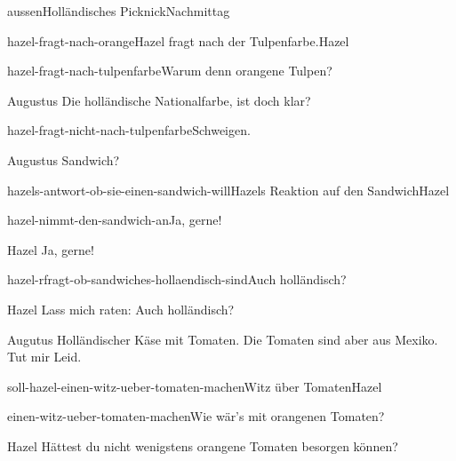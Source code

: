 \documentclass[12pt]{article}
\begin{document}
\begin{scene}{aussen}{Holländisches Picknick}{Nachmittag}
\begin{decision}{hazel-fragt-nach-orange}{\gls{Hazel} fragt nach der Tulpenfarbe.}{Hazel}
\begin{option}{hazel-fragt-nach-tulpenfarbe}{Warum denn orangene Tulpen?}
                \begin{dialog}{Augustus}
                    Die holländische Nationalfarbe, ist doch klar?
                \end{dialog}
            \end{option}

            \begin{option}{hazel-fragt-nicht-nach-tulpenfarbe}{Schweigen.}
            \end{option}
        \end{decision}


        \begin{dialog}{Augustus}
            Sandwich?
        \end{dialog}

        \begin{decision}{hazels-antwort-ob-sie-einen-sandwich-will}{\gls{Hazel}s Reaktion auf den Sandwich}{Hazel}
            \begin{option}{hazel-nimmt-den-sandwich-an}{Ja, gerne!}
                \begin{dialog}{Hazel}
                    Ja, gerne!
                \end{dialog}
            \end{option}

            \begin{option}{hazel-rfragt-ob-sandwiches-hollaendisch-sind}{Auch holländisch?}
                \begin{dialog}{Hazel}
                    Lass mich raten: Auch holländisch?
                \end{dialog}
            \end{option}
        \end{decision}

        \begin{dialog}{Augutus}
            Holländischer Käse mit Tomaten. Die Tomaten sind aber aus Mexiko. Tut mir Leid.
        \end{dialog}


        \begin{decision}{soll-hazel-einen-witz-ueber-tomaten-machen}{Witz über Tomaten}{Hazel}
            \begin{option}{einen-witz-ueber-tomaten-machen}{Wie wär's mit orangenen Tomaten?}
                \begin{dialog}{Hazel}
                    Hättest du nicht wenigstens orangene Tomaten besorgen können?
                \end{dialog}


\end{option}
\end{decision}
\end{scene}
\end{document}
